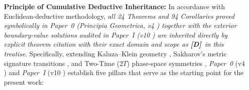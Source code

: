 \documentclass[11pt,a4paper]{article}
\newcommand{\catD}{\textbf{\textcolor{blue!75!black}{[D]}}}
\theoremstyle{plain}
\theoremstyle{definition}
\theoremstyle{remark}
\numberwithin{equation}{section}
\begin{document}
\medskip
\noindent\textbf{Principle of Cumulative Deductive Inheritance:} In accordance with Euclidean-deductive methodology, \textit{all 24 Theorems and 94 Corollaries proved symbolically in \textit{Paper~0} (\textit{Principia Geometrica}, v4 \cite{jimenez2026_p0}) together with the exterior boundary-value solutions audited in \textit{Paper~I} (v10 \cite{jimenez2026a}) are inherited directly by explicit theorem citation with their exact domain and scope as \catD\ in this treatise}. Specifically, extending Kaluza--Klein geometry \cite{kaluza1921,klein1926,overduin1997}, Sakharov's metric signature transitions \cite{sakharov1984}, and Two-Time ($2T$) phase-space symmetries \cite{dirac1936,bars1998,bars2001,bars2008,bars2010,paiman2023,kak2025,kletetschka2025}, \textit{Paper~0} (v4 \cite{jimenez2026_p0}) and \textit{Paper~I} (v10 \cite{jimenez2026a}) establish five pillars that serve as the starting point for the present work:
\end{document}
